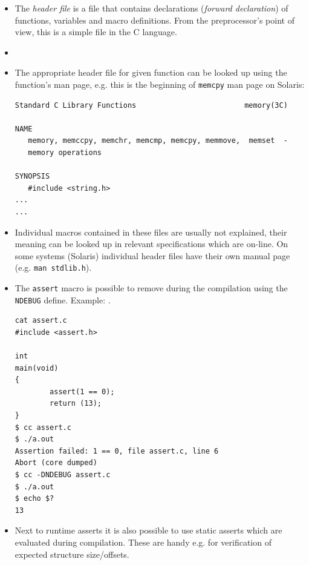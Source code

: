\begin{itemize}
\item The \emph{header file} is a file that contains declarations
(\emph{forward declaration}) of functions, variables and macro definitions.
From the preprocessor's point of view, this is a simple file in the C language.
\item {}
\item The appropriate header file for given function can be looked up using the
function's man page, e.g. this is the beginning of \texttt{memcpy} man page
on Solaris:
\begin{verbatim}
Standard C Library Functions                         memory(3C)

NAME
   memory, memccpy, memchr, memcmp, memcpy, memmove,  memset  -
   memory operations

SYNOPSIS
   #include <string.h>
...
...
\end{verbatim}
\item Individual macros contained in these files are usually not explained,
their meaning can be looked up in relevant specifications which are on-line.
On some systems (Solaris) individual header files have their own manual page
(e.g. \texttt{man stdlib.h}).
\item The \texttt{assert} macro is possible to remove during the compilation
using the \texttt{NDEBUG} define. Example: .

\begin{verbatim}
cat assert.c
#include <assert.h>

int
main(void)
{
        assert(1 == 0);
        return (13);
}
$ cc assert.c
$ ./a.out
Assertion failed: 1 == 0, file assert.c, line 6
Abort (core dumped)
$ cc -DNDEBUG assert.c
$ ./a.out
$ echo $?
13
\end{verbatim}
\item Next to runtime asserts it is also possible to use static asserts
which are evaluated during compilation. These are handy e.g. for verification of
expected structure size/offsets.
\end{itemize}



